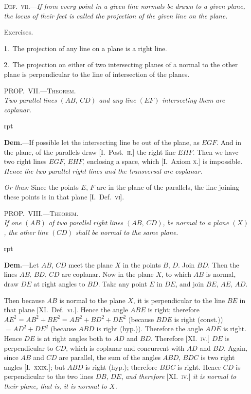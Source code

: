 \documentclass[oneside]{book}
\newcommand\myprop[2]{
\bigskip\Needspace*{4\baselineskip}\begin{center}\textsc{#1}\\\medskip\emph{#2}\par\end{center}
}
\newcommand\exhead[1]{
\Needspace*{5\baselineskip}\begin{center}
\textsf{#1}
\end{center}
}
\newcommand\imgflow[3]{
\setcounter{wrapwidth}{#1}
\begin{wrapfigure}[#2]{r}{\value{wrapwidth}pt}
\begin{center}
\vspace{-0.3in}
\end{center}
\end{wrapfigure}
}
\begin{document}
\smallskip
\textsc{Def.~vii.}---\textit{If from every point in a given line normals
be drawn to a given plane, the locus of their feet is called
the projection of the given line on the plane.}

\exhead{Exercises.}

\begin{footnotesize}
1.~The projection of any line on a plane is a right line.

2.~The projection on either of two intersecting planes of a
normal to the other plane is perpendicular to the line of intersection
of the planes.
\par\end{footnotesize}

\myprop{PROP\@.~VII\@.---Theorem.}{Two parallel lines $(AB,\ CD)$ and any line $(EF)$ intersecting
them are coplanar.}

\imgflow{150}{6}{f221}

\textbf{Dem.}---If possible let the intersecting line be out of
the plane, as $EGF$. And in
the plane, of the parallels
draw [I.~Post.~\textsc{ii}.] the
right line $EHF$.  Then
we have two right lines
$EGF$, $EHF$, enclosing a
space, which [I.~Axiom \textsc{x.}] is impossible. \textit{Hence the
two parallel right lines and the transversal are coplanar.}

\smallskip
\begin{footnotesize}
\emph{Or thus:} Since the points $E$, $F$ are in the plane of the parallels,
the line joining these points is in that plane [I.~Def.~\textsc{vi}].
\par\end{footnotesize}

\myprop{PROP\@.~VIII\@.---Theorem.}{If one $(AB)$ of two parallel right lines $(AB,\ CD)$, be
normal to a plane $(X)$, the other line $(CD)$ shall be normal
to the same plane.}

\imgflow{100}{11}{f222}

\textbf{Dem.}---Let $AB$, $CD$ meet the plane $X$ in the points
$B$, $D$. Join $BD$. Then the lines $AB$, $BD$, $CD$ are coplanar.
Now in the plane $X$, to
which $AB$ is normal, draw $DE$ at
right angles to $BD$. Take any
point $E$ in $DE$, and join $BE$, $AE$,
$AD$.

Then because $AB$ is normal to
the plane $X$, it is perpendicular to
the line $BE$ in that plane [XI\@.\ Def.~\textsc{vi.}].
Hence the angle $ABE$
is right; therefore $AE^{2} = AB^{2} + BE^{2}
= AB^{2} + BD^{2} + DE^{2}$ (because $BDE$
is right (const.)) $= AD^{2} + DE^{2}$ (because $ABD$ is right
(hyp.)). Therefore the angle $ADE$ is right. Hence
$DE$ is at right angles both to $AD$ and $BD$. Therefore
[XI\@.~\textsc{iv.}] $DE$ is perpendicular to $CD$, which is coplanar
and concurrent with $AD$ and $BD$. Again, since $AB$
and $CD$ are parallel, the sum of the angles $ABD$, $BDC$
is two right angles [I.~\textsc{xxix.}]; but $ABD$ is right (hyp.);
therefore $BDC$ is right. Hence $CD$ is perpendicular to
the two lines $DB$, $DE$, \textit{and therefore} [XI\@.~\textsc{iv.}] \textit{it is normal
to their plane, that is, it is normal to $X$.}
\end{document}
